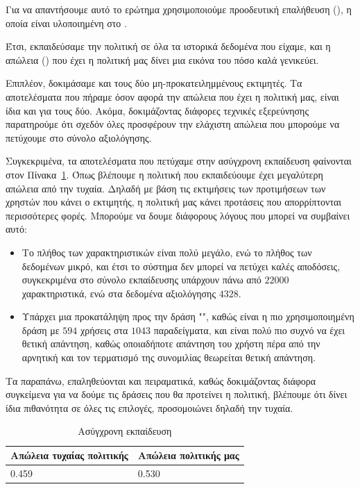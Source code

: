 Για να απαντήσουμε αυτό το ερώτημα χρησιμοποιούμε προοδευτική επαλήθευση (), η οποία είναι υλοποιημένη στο .

Έτσι, εκπαιδεύσαμε την πολιτική σε όλα τα ιστορικά δεδομένα που είχαμε, και η απώλεια () που έχει η πολιτική μας δίνει μια εικόνα του πόσο καλά γενικεύει.

Επιπλέον, δοκιμάσαμε και τους δύο μη-προκατειλημμένους εκτιμητές. Τα αποτελέσματα που πήραμε όσον αφορά την απώλεια που έχει η πολιτική μας, είναι ίδια και για τους δύο. Ακόμα, δοκιμάζοντας διάφορες τεχνικές εξερεύνησης παρατηρούμε ότι σχεδόν όλες προσφέρουν την ελάχιστη απώλεια που μπορούμε να πετύχουμε στο σύνολο αξιολόγησης.

Συγκεκριμένα, τα αποτελέσματα που πετύχαμε στην ασύγχρονη εκπαίδευση φαίνονται στον Πίνακα~\ref{tab:offline_learning}. Όπως βλέπουμε η πολιτική που εκπαιδεύουμε έχει μεγαλύτερη απώλεια από την τυχαία. Δηλαδή με βάση τις εκτιμήσεις των προτιμήσεων των χρηστών που κάνει ο εκτιμητής, η πολιτική μας κάνει προτάσεις που απορρίπτονται περισσότερες φορές. Μπορούμε να δουμε διάφορους λόγους που μπορεί να συμβαίνει αυτό:
\begin{itemize}
    \item Το πλήθος των χαρακτηριστικών είναι πολύ μεγάλο, ενώ το πλήθος των δεδομένων μικρό, και έτσι το σύστημα δεν μπορεί να πετύχει καλές αποδόσεις, συγκεκριμένα στο σύνολο εκπαίδευσης υπάρχουν πάνω από $22000$ χαρακτηριστικά, ενώ στα δεδομένα αξιολόγησης $4328$.
    \item Υπάρχει μια προκατάληψη προς την δράση "", καθώς είναι η πιο χρησιμοποιημένη δράση με $594$ χρήσεις στα $1043$ παραδείγματα, και είναι πολύ πιο συχνό να έχει θετική απάντηση, καθώς οποιαδήποτε απάντηση του χρήστη πέρα από την αρνητική και τον τερματισμό της συνομιλίας θεωρείται θετική απάντηση.
\end{itemize}

Τα παραπάνω, επαληθεύονται και πειραματικά, καθώς δοκιμάζοντας διάφορα συγκείμενα για να δούμε τις δράσεις που θα προτείνει η πολιτική, βλέπουμε ότι δίνει ίδια πιθανότητα σε όλες τις επιλογές, προσομοιώνει δηλαδή την τυχαία.

\begin{table}
    \centering
    \begin{tabularx}{\textwidth}{|X|X|}
        \hline
        Απώλεια τυχαίας πολιτικής & Απώλεια πολιτικής μας \\
        \hline
        0.459                     & 0.530                 \\
        \hline
    \end{tabularx}
    \caption{Ασύγχρονη εκπαίδευση}
    \label{tab:offline_learning}
\end{table}


